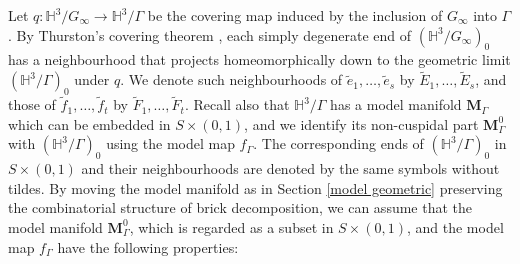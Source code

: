 \documentclass{amsart}
\theoremstyle{definition}
\newcommand{\G}{{\Gamma}}
\newcommand\HHH{{\mathbb H}}
\begin{document}
Let $q: \HHH^3/G_\infty \rightarrow \HHH^3/\Gamma$ be the covering map  induced by the inclusion of $G_\infty$ into $\Gamma$.
By Thurston's covering theorem \cite{thurstonnotes, canary-cover, OhQ}, each simply degenerate end of $(\HHH^3/G_\infty)_0$ has a neighbourhood that projects homeomorphically down to the geometric limit $(\HHH^3/\Gamma)_0$ under $q$.
We denote such neighbourhoods of $\tilde e_1, \dots, \tilde e_s$ by $\widetilde E_1, \dots , \widetilde E_s$, and those of $\tilde f_1, \dots , \tilde f_t$ by $\widetilde F_1, \dots, \widetilde F_t$.
Recall also that $\HHH^3/\Gamma$ has a  model manifold $\mathbf M_\Gamma$ which can be embedded in $S \times (0,1)$,  and we identify its non-cuspidal part $\mathbf M_\Gamma^0$ with $(\HHH^3/\Gamma)_0$ using the model map $f_\G$.
The corresponding ends of $(\HHH^3/\Gamma)_0$ in $S\times (0,1)$ and their neighbourhoods are denoted by the same symbols without tildes.
By moving the model manifold as in Section \ref{model geometric} preserving the combinatorial structure of  brick decomposition, 
we can assume that the model manifold $\mathbf M_\Gamma^0$, which is regarded as a subset in $S\times (0,1)$, and the model map $f_\Gamma$ have the following properties:
\end{document}
